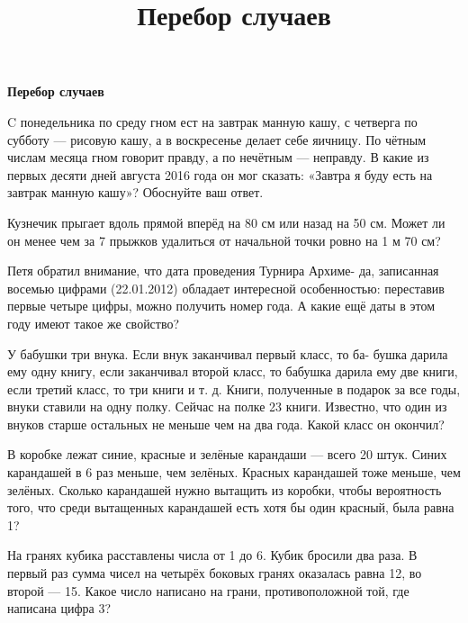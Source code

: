 \centerline{\bf \Huge Перебор случаев}
\title{Перебор случаев}


 C понедельника по среду гном ест на завтрак манную кашу, с четверга по субботу — рисовую кашу, а в воскресенье делает себе яичницу. По чётным числам месяца гном говорит правду, а по нечётным — неправду. В какие из первых десяти дней августа 2016 года он мог сказать: «Завтра я буду есть на завтрак манную кашу»? Обоснуйте ваш ответ.

 Кузнечик прыгает вдоль прямой вперёд на 80 см или назад на 50 см. Может ли он менее чем за 7 прыжков удалиться от начальной точки ровно на 1 м 70 см?

 Петя обратил внимание, что дата проведения Турнира Архиме- да, записанная восемью цифрами (22.01.2012) обладает интересной особенностью: переставив первые четыре цифры, можно получить номер года. А какие ещё даты в этом году имеют такое же свойство?

 У бабушки три внука. Если внук заканчивал первый класс, то ба- бушка дарила ему одну книгу, если заканчивал второй класс, то бабушка дарила ему две книги, если третий класс, то три книги и т. д. Книги, полученные в подарок за все годы, внуки ставили на одну полку. Сейчас на полке 23 книги. Известно, что один из внуков старше остальных не меньше чем на два года. Какой класс он окончил? 

 В коробке лежат синие, красные и зелёные карандаши — всего 20 штук. Синих карандашей в 6 раз меньше, чем зелёных. Красных карандашей тоже меньше, чем зелёных. Сколько карандашей нужно вытащить из коробки, чтобы вероятность того, что среди вытащенных карандашей есть хотя бы один красный, была равна 1?

 На гранях кубика расставлены числа от 1 до 6. Кубик бросили два раза. В первый раз сумма чисел на четырёх боковых гранях оказалась равна 12, во второй — 15. Какое число написано на грани, противоположной той, где написана цифра 3?